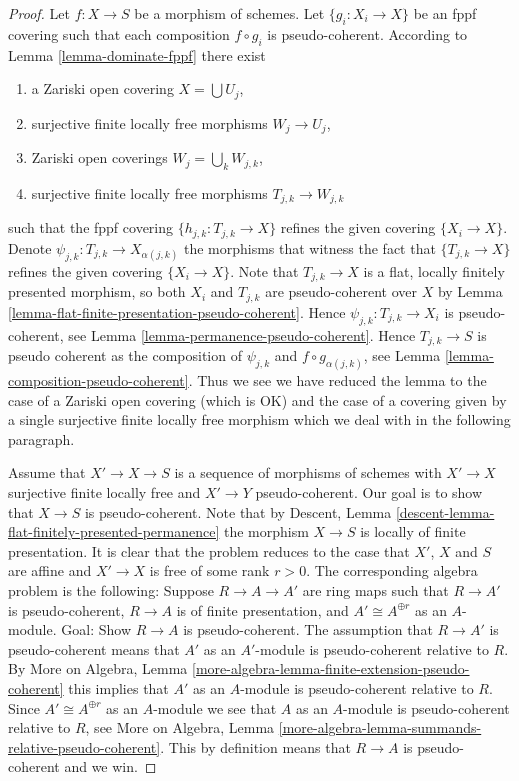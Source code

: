 \documentclass[10pt,a4paper]{amsart}
\theoremstyle{plain}
\theoremstyle{definition}
\theoremstyle{remark}
\numberwithin{equation}{subsection}
\begin{document}
\begin{proof}
Let $f : X \to S$ be a morphism of schemes.
Let $\{g_i : X_i \to X\}$ be an fppf covering such that each composition
$f \circ g_i$ is pseudo-coherent. According to
Lemma \ref{lemma-dominate-fppf}
there exist
\begin{enumerate}
\item a Zariski open covering $X = \bigcup U_j$,
\item surjective finite locally free morphisms $W_j \to U_j$,
\item Zariski open coverings $W_j = \bigcup_k W_{j, k}$,
\item surjective finite locally free morphisms $T_{j, k} \to W_{j, k}$
\end{enumerate}
such that the fppf covering $\{h_{j, k} : T_{j, k} \to X\}$ refines the given
covering $\{X_i \to X\}$. Denote $\psi_{j, k} : T_{j, k} \to X_{\alpha(j, k)}$
the morphisms that witness the fact that $\{T_{j, k} \to X\}$ refines
the given covering $\{X_i \to X\}$. Note that $T_{j, k} \to X$ is a flat,
locally finitely presented morphism, so both $X_i$ and $T_{j, k}$ are
pseudo-coherent over $X$ by
Lemma \ref{lemma-flat-finite-presentation-pseudo-coherent}.
Hence $\psi_{j, k} : T_{j, k} \to X_i$ is pseudo-coherent, see
Lemma \ref{lemma-permanence-pseudo-coherent}.
Hence $T_{j, k} \to S$ is pseudo coherent as the composition
of $\psi_{j, k}$ and $f \circ g_{\alpha(j, k)}$, see
Lemma \ref{lemma-composition-pseudo-coherent}.
Thus we see we have reduced the lemma to the case of
a Zariski open covering (which is OK) and the case of a covering
given by a single surjective finite locally free morphism which we
deal with in the following paragraph.

\medskip\noindent
Assume that $X' \to X \to S$ is a sequence of morphisms of schemes
with $X' \to X$ surjective finite locally free and $X' \to Y$ pseudo-coherent.
Our goal is to show that $X \to S$ is pseudo-coherent.
Note that by
Descent, Lemma \ref{descent-lemma-flat-finitely-presented-permanence}
the morphism $X \to S$ is locally of finite presentation.
It is clear that the problem reduces to the case that $X'$, $X$ and $S$
are affine and $X' \to X$ is free of some rank $r > 0$. The corresponding
algebra problem is the following: Suppose $R \to A \to A'$ are ring maps
such that $R \to A'$ is pseudo-coherent, $R \to A$ is of finite presentation,
and $A' \cong A^{\oplus r}$ as an $A$-module. Goal: Show $R \to A$ is
pseudo-coherent. The assumption that $R \to A'$ is pseudo-coherent
means that $A'$ as an $A'$-module is pseudo-coherent relative to $R$. By
More on Algebra,
Lemma \ref{more-algebra-lemma-finite-extension-pseudo-coherent}
this implies that $A'$ as an $A$-module is pseudo-coherent relative to $R$.
Since $A' \cong A^{\oplus r}$ as an $A$-module we see that
$A$ as an $A$-module is pseudo-coherent relative to $R$, see
More on Algebra,
Lemma \ref{more-algebra-lemma-summands-relative-pseudo-coherent}.
This by definition means that $R \to A$ is pseudo-coherent and we win.
\end{proof}
\end{document}

